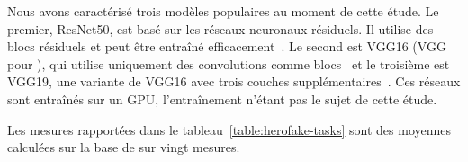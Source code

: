 \begin{table}[!ht]
    \caption{Caractérisation des charges de travail.}
    \centering
    \label{table:herofake-tasks}
\end{table}

Nous avons caractérisé trois modèles populaires au moment de cette étude. Le premier, ResNet50, est basé sur les réseaux neuronaux résiduels. Il utilise des blocs résiduels et peut être entraîné efficacement~\cite{NEURIPS2019_7716d0fc}. Le second est VGG16 (VGG pour ), qui utilise uniquement des convolutions comme blocs~\cite{DBLP:journals/corr/SimonyanZ14a} et le troisième est VGG19, une variante de VGG16 avec trois couches supplémentaires~\cite{biom10070984}. Ces réseaux sont entraînés sur un \gls{GPU}, l'entraînement n'étant pas le sujet de cette étude.

Les mesures rapportées dans le tableau~\ref{table:herofake-tasks} sont des moyennes calculées sur la base de sur vingt mesures.

